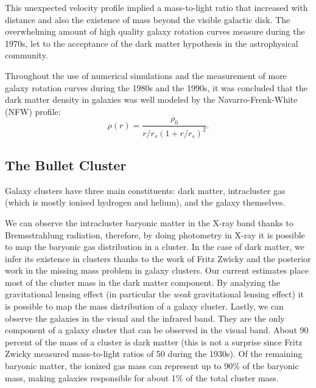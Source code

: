 This unexpected velocity profile implied a mass-to-light ratio that increased with distance and also the existence of mass beyond the visible galactic disk\cite{theIsMassOutside}.
The overwhelming amount of high quality galaxy rotation curves measure during the 1970s, let to the acceptance of the dark matter hypothesis in the astrophysical community.

Throughout the use of numerical simulations and the measurement of more galaxy rotation curves during the 1980s and the 1990s, it was concluded that the dark matter density in galaxies was well modeled by the Navarro-Frenk-White (NFW) profile:\cite{FWN}\cite{mariangela}
\begin{equation}
\rho(r) = \frac{\rho_0}{r/r_s(1+r/r_s)^2} \text{.}
\end{equation}
\subsection{The Bullet Cluster}
\label{bulletExplain}
Galaxy clusters have three main constituents: dark matter, intracluster gas (which is mostly ionised hydrogen and helium), and the galaxy themselves.\cite{book:75345}

We can observe the intracluster baryonic matter in the X-ray band thanks to Bremsstrahlung radiation, therefore, by doing photometry in X-ray it is possible to map the baryonic gas distribution in a cluster.
In the case of dark matter, we infer its existence in clusters thanks to the work of Fritz Zwicky and the posterior work in the missing mass problem in galaxy clusters.
Our current estimates place most of the cluster mass in the dark matter component.
By analyzing the gravitational lensing effect (in particular the \emph{weak} gravitational lensing effect) it is possible to map the mass distribution of a galaxy cluster. 
Lastly, we can observe the galaxies in the visual and the infrared band.
They are the only component of a galaxy cluster that can be observed in the visual band.
About 90 percent of the mass of a cluster is dark matter (this is not a surprise since Fritz Zwicky measured mass-to-light ratios of 50 during the 1930s). Of the remaining baryonic matter, the ionized gas mass can represent up to 90$\%$ of the baryonic mass, making galaxies responsible for about 1$\%$ of the total cluster mass.

